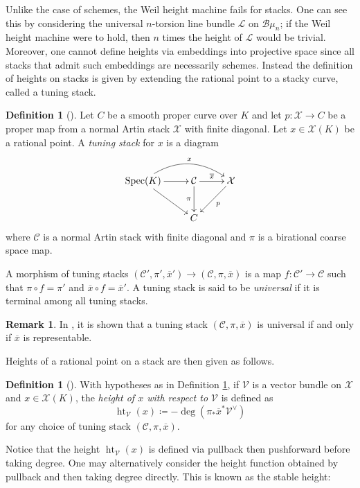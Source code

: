 \documentclass[a4paper,12pt]{amsart}
\theoremstyle{definition}
\newtheorem{defn}[thm]{Definition}
\newtheorem{rmk}[thm]{Remark}
\newcommand{\cX}{\mathcal{X}}
\newcommand{\cC}{\mathcal{C}}
\DeclareMathOperator{\height}{ht}
\DeclareMathOperator{\Spec}{Spec}
\begin{document}
	Unlike the case of schemes, the Weil height machine fails for stacks. One can see this by considering the universal $n$-torsion line bundle $\mathcal{L}$ on $\mathcal{B} \mu_n$; if the Weil height machine were to hold, then $n$ times the height of $\mathcal{L}$ would be trivial. Moreover, one cannot define heights via embeddings into projective space since all stacks that admit such embeddings are necessarily schemes. Instead the definition of heights on stacks is given by extending the rational point to a stacky curve, called a tuning stack.
	
	\begin{defn}[{\cite[Def. 2.1]{ESZB}}]
		\label{def:tuning stack}
		Let $C$ be a smooth proper curve over $K$ and let $p\colon\cX\to C$ be a proper map from a normal Artin stack $\cX$ with finite diagonal. Let $x\in\cX(K)$ be a rational point. A \emph{tuning stack} for $x$ is a diagram
		\[
		\xymatrix{
			\Spec(K)\ar[r]\ar[dr]\ar@/^1.5pc/[rr]^-{x} & \cC\ar[d]_-{\pi}\ar[r]^-{\overline{x}} & \cX\ar[dl]^-{p}\\
			& C &
		}
		\]
		where $\cC$ is a normal Artin stack with finite diagonal and $\pi$ is a birational coarse space map.
		
		A morphism of tuning stacks $(\cC',\pi',\overline{x}')\to(\cC,\pi,\overline{x})$ is a map $f\colon\cC'\to\cC$ such that $\pi\circ f=\pi'$ and $\overline{x}\circ f=\overline{x}'$. A tuning stack is said to be \emph{universal} if it is terminal among all tuning stacks.
	\end{defn}
	
	\begin{rmk}\label{rmk:universal-tuning-stack-rep}
		In \cite[Cor. 2.6]{ESZB}, it is shown that a tuning stack $(\cC,\pi,\overline{x})$ is universal if and only if $\overline{x}$ is representable.
	\end{rmk}
	
	Heights of a rational point on a stack are then given as follows.
	
	\begin{defn}[{\cite[Def. 2.11]{ESZB}}]
		\label{def:stacky-ht}
		With hypotheses as in Definition \ref{def:tuning stack}, if $\mathcal{V}$ is a vector bundle on $\cX$ and $x\in\cX(K)$, the \emph{height of $x$ with respect to $\mathcal{V}$} is defined as
		\[
		\height_{\mathcal{V}}(x) \coloneqq -\deg(\pi_*\overline{x}^*\mathcal{V}^\vee)
		\]
		for any choice of tuning stack $(\cC,\pi,\overline{x})$.
	\end{defn}
	
	Notice that the height $\height_{\mathcal{V}}(x)$ is defined via pullback then pushforward before taking degree. One may alternatively consider the height function obtained by pullback and then taking degree directly. This is known as the stable height:
	
\end{document}
